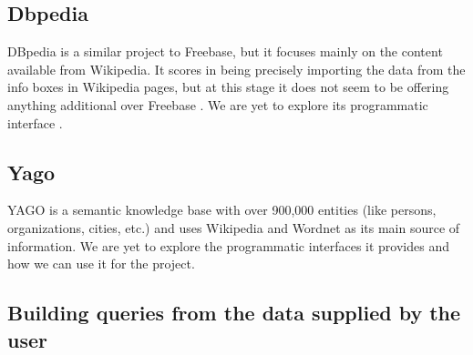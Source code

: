 \documentclass[12pt]{article}
\begin{document}
\subsection{Dbpedia}
DBpedia is a similar project to Freebase, but it focuses mainly on the content
available from Wikipedia. It scores in being precisely importing the data from
the info boxes in Wikipedia pages, but at this stage it does not seem to be
offering anything additional over Freebase \cite{freebasedbpedia}. We are yet to
explore its programmatic interface \cite{dbpediaapi}.


\subsection{Yago}
YAGO is a semantic knowledge base with over 900,000 entities (like persons,
organizations, cities, etc.) and uses Wikipedia and Wordnet as its main source of
information. We are yet to explore the programmatic interfaces it provides and
how we can use it for the project.



\subsection {Building queries from the data supplied by the user}
\end{document}
